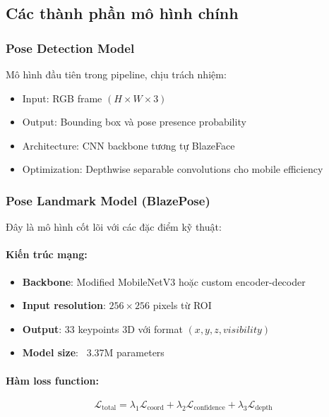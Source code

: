 \subsection{Các thành phần mô hình chính}

\subsubsection{Pose Detection Model}
Mô hình đầu tiên trong pipeline, chịu trách nhiệm:
\begin{itemize}
    \item Input: RGB frame $(H \times W \times 3)$
    \item Output: Bounding box và pose presence probability
    \item Architecture: CNN backbone tương tự BlazeFace
    \item Optimization: Depthwise separable convolutions cho mobile efficiency
\end{itemize}

\subsubsection{Pose Landmark Model (BlazePose)}
Đây là mô hình cốt lõi với các đặc điểm kỹ thuật:

\paragraph{Kiến trúc mạng:}
\begin{itemize}
    \item \textbf{Backbone}: Modified MobileNetV3 hoặc custom encoder-decoder
    \item \textbf{Input resolution}: $256 \times 256$ pixels từ ROI
    \item \textbf{Output}: 33 keypoints 3D với format $(x, y, z, visibility)$
    \item \textbf{Model size}: ~3.37M parameters
\end{itemize}

\paragraph{Hàm loss function:}
\begin{equation}
\mathcal{L}_{\text{total}} = \lambda_1 \mathcal{L}_{\text{coord}} + \lambda_2 \mathcal{L}_{\text{confidence}} + \lambda_3 \mathcal{L}_{\text{depth}}
\end{equation}

